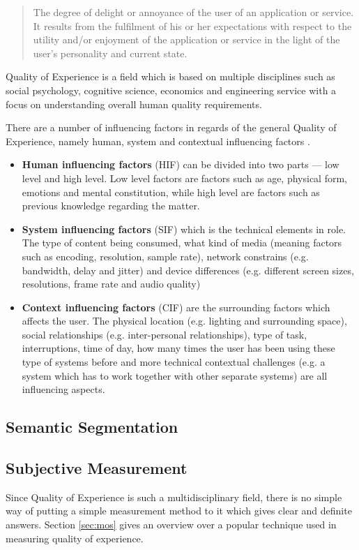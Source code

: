 \begin{quote}
The degree of delight or annoyance of the user of an application or service. It results from the fulfilment of his or her expectations with respect to the utility and/or enjoyment of the application or service in the light of the user’s personality and current state.
\end{quote}

Quality of Experience is a field which is based on multiple disciplines such as social psychology, cognitive science, economics and engineering service with a focus on understanding overall human quality requirements.

There are a number of influencing factors in regards of the general Quality of Experience, namely human, system and contextual influencing factors \cite{factors_QoE}.
\begin{itemize}
    \item \textbf{Human influencing factors} (HIF) can be divided into two parts — low level and high level. Low level factors are factors such as age, physical form, emotions and mental constitution, while high level are factors such as previous knowledge regarding the matter. 
    \item \textbf{System influencing factors} (SIF) which is the technical elements in role. The type of content being consumed, what kind of media (meaning factors such as encoding, resolution, sample rate), network constrains (e.g. bandwidth, delay and jitter) and device differences (e.g. different screen sizes, resolutions, frame rate and audio quality)
    \item \textbf{Context influencing factors} (CIF) are the surrounding factors which affects the user. The physical location (e.g. lighting and surrounding space), social relationships (e.g. inter-personal relationships), type of task, interruptions, time of day, how many times the user has been using these type of systems before and more technical contextual challenges (e.g. a system which has to work together with other separate systems) are all influencing aspects.
\end{itemize}


\subsection{Semantic Segmentation}

\subsection{Subjective Measurement}
\label{sec:measurement}
Since Quality of Experience is such a multidisciplinary field, there is no simple way of putting a simple measurement method to it which gives clear and definite answers. Section \ref{sec:mos} gives an overview over a popular technique used in measuring quality of experience. 

